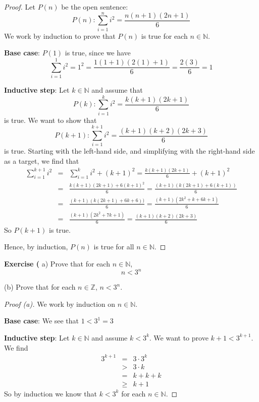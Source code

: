 \documentclass[12pt,oneside]{article}
\newenvironment{exercise}[1]{\vspace{.1in}\noindent\textbf{Exercise #1 \hspace{.05em}}}{}
\newcommand{\Z}{\mathbb{Z}}
\newcommand{\N}{\mathbb{N}}
\begin{document}
\begin{proof}
Let $P(n)$ be the open sentence:
\[P(n): \sum_{i=1}^{n} i^2 = \frac{n(n+1)(2n+1)}{6}\]
We work by induction to prove that $P(n)$ is true for each $n \in \N$.

\textbf{Base case}: $P(1)$ is true, since we have
\[\sum_{i=1}^{1} i^2 = 1^2 = \frac{1(1+1)(2(1)+1)}{6} = \frac{2(3)}{6} = 1 \]

\textbf{Inductive step}: Let $k \in \N$ and assume that
\[P(k): \sum_{i=1}^{k} i^2 = \frac{k(k+1)(2k+1)}{6}\]
is true. We want to show that
\[P(k+1): \sum_{i=1}^{k+1} i^2 = \frac{(k+1)(k+2)(2k+3)}{6}\]
is true. Starting with the left-hand side, and simplifying with the right-hand side as a target, we find that
\begin{eqnarray*}
\sum_{i=1}^{k+1} i^2 &=& \sum_{i=1}^{k} i^2 + (k+1)^2 =  \frac{k(k+1)(2k+1)}{6} + (k+1)^2 \\
&=& \frac{k(k+1)(2k+1) + 6(k+1)^2}{6} = \frac{(k+1)(k(2k+1) + 6(k + 1))}{6} \\
&=& \frac{(k+1)(k(2k+1) + 6k + 6))}{6} = \frac{(k+1)(2k^2+k+6k+1)}{6} \\ 
&=& \frac{(k+1)(2k^2+7k+1)}{6} = \frac{(k+1)(k+2)(2k+3)}{6} 
\end{eqnarray*}
So $P(k + 1)$ is true.

Hence, by induction, $P(n)$ is true for all $n \in \N$.
\end{proof}



\begin{exercise}{13.4}
(a) Prove that for each $n \in \N$,
\[n < 3^n\]

(b) Prove that for each $n \in \Z$, $n < 3^n$.
\end{exercise}

\begin{proof}[Proof (a)]
We work by induction on $n \in \N$.

\textbf{Base case}: We see that $1 < 3^1 = 3$

\textbf{Inductive step}: Let $k \in \N$ and assume $k < 3^k$. We want to prove $k+1 < 3^{k+1}$. We find
\begin{eqnarray*}
3^{k+1} &=& 3 \cdot 3^k \\
&>& 3 \cdot k \\
&=& k + k + k \\
&\geq& k + 1
\end{eqnarray*}
So by induction we know that $k < 3^k$ for each $n \in \N$.
\end{proof}
\end{document}
